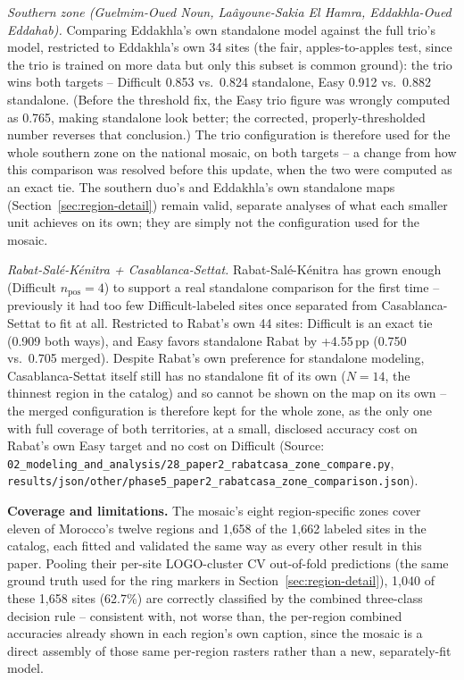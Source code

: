 \documentclass[11pt,a4paper]{article}
\begin{document}
\emph{Southern zone (Guelmim-Oued Noun, Laâyoune-Sakia El Hamra, Eddakhla-Oued Eddahab).} Comparing Eddakhla's own standalone model against the full trio's model, restricted to Eddakhla's own 34 sites (the fair, apples-to-apples test, since the trio is trained on more data but only this subset is common ground): the trio wins both targets -- Difficult 0.853 vs.\ 0.824 standalone, Easy 0.912 vs.\ 0.882 standalone. (Before the threshold fix, the Easy trio figure was wrongly computed as 0.765, making standalone look better; the corrected, properly-thresholded number reverses that conclusion.) The trio configuration is therefore used for the whole southern zone on the national mosaic, on both targets -- a change from how this comparison was resolved before this update, when the two were computed as an exact tie. The southern duo's and Eddakhla's own standalone maps (Section~\ref{sec:region-detail}) remain valid, separate analyses of what each smaller unit achieves on its own; they are simply not the configuration used for the mosaic.

\emph{Rabat-Salé-Kénitra + Casablanca-Settat.} Rabat-Salé-Kénitra has grown enough (Difficult $n_\text{pos}=4$) to support a real standalone comparison for the first time -- previously it had too few Difficult-labeled sites once separated from Casablanca-Settat to fit at all. Restricted to Rabat's own 44 sites: Difficult is an exact tie (0.909 both ways), and Easy favors standalone Rabat by +4.55\,pp (0.750 vs.\ 0.705 merged). Despite Rabat's own preference for standalone modeling, Casablanca-Settat itself still has no standalone fit of its own ($N=14$, the thinnest region in the catalog) and so cannot be shown on the map on its own -- the merged configuration is therefore kept for the whole zone, as the only one with full coverage of both territories, at a small, disclosed accuracy cost on Rabat's own Easy target and no cost on Difficult (Source: \texttt{02\_modeling\_and\_analysis/28\_paper2\_rabatcasa\_zone\_compare.py}, \texttt{results/json/other/phase5\_paper2\_rabatcasa\_zone\_comparison.json}).

\textbf{Coverage and limitations.}
\label{sec:mosaic-limits}
The mosaic's eight region-specific zones cover eleven of Morocco's twelve regions and 1{,}658 of the 1{,}662 labeled sites in the catalog, each fitted and validated the same way as every other result in this paper. Pooling their per-site LOGO-cluster CV out-of-fold predictions (the same ground truth used for the ring markers in Section~\ref{sec:region-detail}), 1{,}040 of these 1{,}658 sites (62.7\%) are correctly classified by the combined three-class decision rule -- consistent with, not worse than, the per-region combined accuracies already shown in each region's own caption, since the mosaic is a direct assembly of those same per-region rasters rather than a new, separately-fit model.
\end{document}
